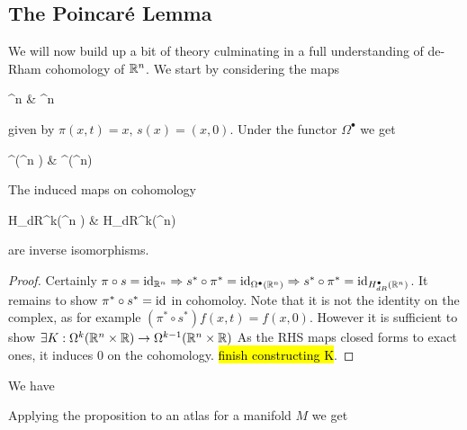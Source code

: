 \documentclass{article}
\begin{document}
\subsection{The Poincar\'e Lemma}
We will now build up a bit of theory culminating in a full understanding of de-Rham cohomology of $\mathbb{R}^n$. We start by considering the maps 
\begin{tkz}
	^n \times {}  & ^n 	
\end{tkz}
given by $\pi(x,t) = x, \, s(x) = (x,0)$. Under the functor $\Omega^\bullet$ we get 
\begin{tkz}
	\Omega^\bullet(^n \times {})  & \Omega^\bullet(^n) 	
\end{tkz}

\begin{prop}
	The induced maps on cohomology
	\begin{tkz}
		H_{dR}^k(^n \times {})  & H_{dR}^k(^n) 	
	\end{tkz}	
	are inverse isomorphisms. 
\end{prop}
\begin{proof}
	Certainly $\pi \circ s = \operatorname{id}_{\mathbb{R}^n} \Rightarrow s^\ast \circ \pi^\ast = \operatorname{id}_{\Omega^\bullet(\mathbb{R}^n)} \Rightarrow s^\ast \circ \pi^\ast = \operatorname{id}_{H_{dR}^\bullet(\mathbb{R}^n)}$. It remains to show $\pi^\ast \circ s^\ast = \operatorname{id}$ in cohomoloy. Note that it is not the identity on the complex, as for example $(\pi^\ast \circ s^\ast)f(x,t) = f(x,0)$. However it is sufficient to show $\exists K:\Omega^k(\mathbb{R}^n \times \mathbb{R}) \to \Omega^{k-1}(\mathbb{R}^n \times \mathbb{R})$
	As the RHS maps closed forms to exact ones, it induces $0$ on the cohomology. \hl{finish constructing K}. 
\end{proof}

\begin{corollary}
	We have 
\end{corollary}

\begin{corollary}
	Applying the proposition to an atlas for a manifold $M$ we get 
	
\end{corollary}
\end{document}
